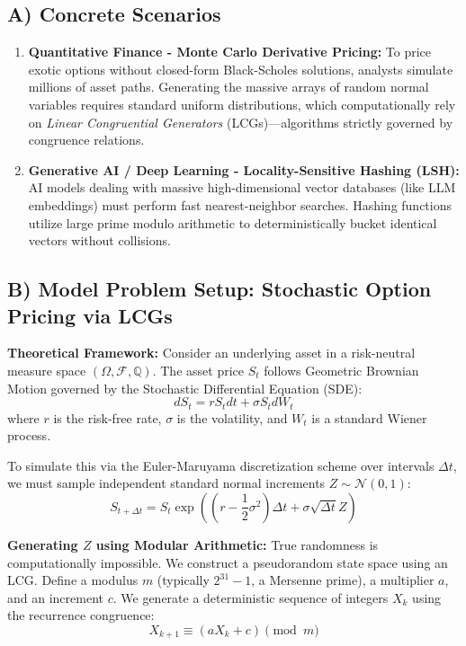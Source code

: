 \documentclass[11pt]{article}
\begin{document}
\subsection{A) Concrete Scenarios}
\begin{enumerate}
    \item \textbf{Quantitative Finance - Monte Carlo Derivative Pricing:} To price exotic options without closed-form Black-Scholes solutions, analysts simulate millions of asset paths. Generating the massive arrays of random normal variables requires standard uniform distributions, which computationally rely on \textit{Linear Congruential Generators} (LCGs)—algorithms strictly governed by congruence relations.
    \item \textbf{Generative AI / Deep Learning - Locality-Sensitive Hashing (LSH):} AI models dealing with massive high-dimensional vector databases (like LLM embeddings) must perform fast nearest-neighbor searches. Hashing functions utilize large prime modulo arithmetic to deterministically bucket identical vectors without collisions.
\end{enumerate}

\subsection{B) Model Problem Setup: Stochastic Option Pricing via LCGs}

\textbf{Theoretical Framework:}
Consider an underlying asset in a risk-neutral measure space $(\Omega, \mathcal{F}, \mathbb{Q})$. The asset price $S_t$ follows Geometric Brownian Motion governed by the Stochastic Differential Equation (SDE):
\[ dS_t = r S_t dt + \sigma S_t dW_t \]
where $r$ is the risk-free rate, $\sigma$ is the volatility, and $W_t$ is a standard Wiener process. 

To simulate this via the Euler-Maruyama discretization scheme over intervals $\Delta t$, we must sample independent standard normal increments $Z \sim \mathcal{N}(0,1)$:
\[ S_{t+\Delta t} = S_t \exp\left( \left(r - \frac{1}{2}\sigma^2\right)\Delta t + \sigma \sqrt{\Delta t} Z \right) \]

\textbf{Generating $Z$ using Modular Arithmetic:}
True randomness is computationally impossible. We construct a pseudorandom state space using an LCG. Define a modulus $m$ (typically $2^{31}-1$, a Mersenne prime), a multiplier $a$, and an increment $c$. We generate a deterministic sequence of integers $X_k$ using the recurrence congruence:
\[ X_{k+1} \equiv (a X_k + c) \pmod m \]
\end{document}

